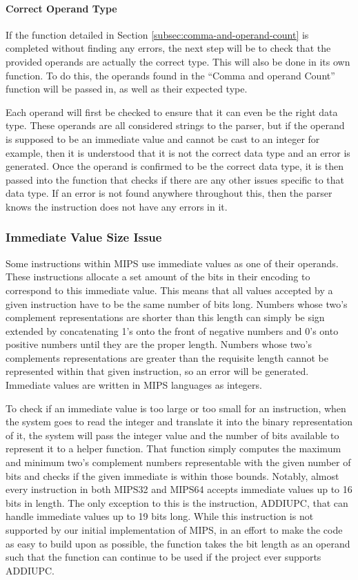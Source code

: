 \documentclass[
    paper=letter,
    parskip=half,
    fontsize=12pt,
    titlepage=firstiscover,
    toc=bibliography,
    numbers=endperiod
]{scrartcl}
\begin{document}
\paragraph{Correct Operand Type}

If the function detailed in Section \ref{subsec:comma-and-operand-count}
is completed without finding any errors, the next step will be to check
that the provided operands are actually the correct type. This will also
be done in its own function. To do this, the operands found in the
``Comma and operand Count'' function will be passed in, as well as their
expected type.

Each operand will first be checked to ensure that it can even be the
right data type. These operands are all considered strings to the
parser, but if the operand is supposed to be an immediate value and
cannot be cast to an integer for example, then it is understood that it
is not the correct data type and an error is generated. Once the operand
is confirmed to be the correct data type, it is then passed into the
function that checks if there are any other issues specific to that data
type. If an error is not found anywhere throughout this, then the parser
knows the instruction does not have any errors in it.

\subsubsection{Immediate Value Size Issue}

Some instructions within MIPS use immediate values as one of their
operands. These instructions allocate a set amount of the bits in their
encoding to correspond to this immediate value. This means that all
values accepted by a given instruction have to be the same number of
bits long. Numbers whose two's complement representations are shorter
than this length can simply be sign extended by concatenating 1's onto
the front of negative numbers and 0's onto positive numbers until they
are the proper length. Numbers whose two's complements representations
are greater than the requisite length cannot be represented within that
given instruction, so an error will be generated. Immediate values are
written in MIPS languages as integers.

To check if an immediate value is too large or too small for an
instruction, when the system goes to read the integer and translate it
into the binary representation of it, the system will pass the integer
value and the number of bits available to represent it to a helper
function. That function simply computes the maximum and minimum two's
complement numbers representable with the given number of bits and
checks if the given immediate is within those bounds. Notably, almost
every instruction in both MIPS32 and MIPS64 accepts immediate values up
to 16 bits in length. The only exception to this is the instruction,
ADDIUPC, that can handle immediate values up to 19 bits long. While this
instruction is not supported by our initial implementation of MIPS, in
an effort to make the code as easy to build upon as possible, the
function takes the bit length as an operand such that the function can
continue to be used if the project ever supports ADDIUPC.
\end{document}

